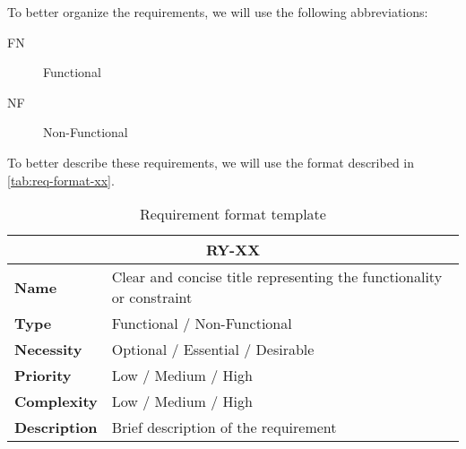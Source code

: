 To better organize the requirements, we will use the following abbreviations:

\begin{description}
    \item[FN]  Functional
    \item[NF]  Non-Functional
\end{description}


To better describe these requirements, we will use the format described in \autoref{tab:req-format-xx}.


\begin{table}[H]
    \centering
    \begin{tabular}{l p{10cm}}
        \toprule
        \multicolumn{2}{c}{\textbf{RY-XX}} \\
        \toprule
        \textbf{Name}               & Clear and concise title representing the functionality or constraint \\
        \textbf{Type}               & Functional / Non-Functional \\
        \textbf{Necessity}          & Optional / Essential / Desirable \\
        \textbf{Priority}           & Low / Medium / High \\
        \textbf{Complexity}         & Low / Medium / High \\
        \textbf{Description}        & Brief description of the requirement \\
        \bottomrule
    \end{tabular}
\caption{Requirement format template}\label{tab:req-format-xx}
\end{table}

